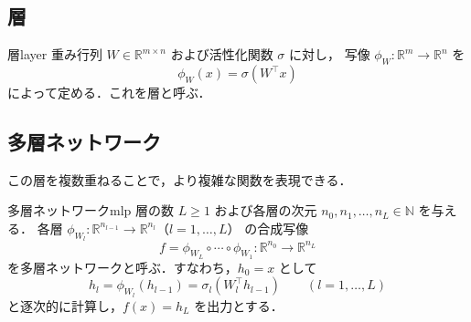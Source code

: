 \documentclass[uplatex, dvipdfmx]{jsarticle}
\begin{document}
\subsection{層}

\begin{definition}{層}{layer}
重み行列 $W\in\mathbb{R}^{m\times n}$ および活性化関数 $\sigma$ に対し，
写像 $\phi_W\colon\mathbb{R}^{m}\to\mathbb{R}^{n}$ を
\[
\phi_W(x) = \sigma(W^\top x)
\]
によって定める．これを層と呼ぶ．
\end{definition}

\subsection{多層ネットワーク}

この層を複数重ねることで，より複雑な関数を表現できる．

\begin{definition}{多層ネットワーク}{mlp}
層の数 $L\ge 1$ および各層の次元 $n_0,n_1,\ldots,n_L\in\mathbb{N}$ を与える．
各層 $\phi_{W_l}\colon\mathbb{R}^{n_{l-1}}\to\mathbb{R}^{n_l}$（$l=1,\ldots,L$）
の合成写像
\[
f = \phi_{W_L}\circ\cdots\circ\phi_{W_1}
\colon\mathbb{R}^{n_0}\to\mathbb{R}^{n_L}
\]
を多層ネットワークと呼ぶ．すなわち，$h_0=x$ として
\[
h_l = \phi_{W_l}(h_{l-1}) = \sigma_l(W_l^\top h_{l-1})
\qquad (l=1,\ldots,L)
\]
と逐次的に計算し，$f(x)=h_L$ を出力とする．
\end{definition}
\end{document}
